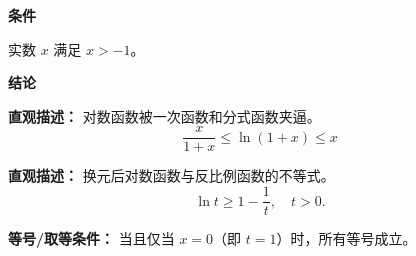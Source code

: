 \begin{statementbox}
\textbf{\textcolor{CStatement}{条件}}
\begin{description}[style=nextline, leftmargin=2.8em, labelsep=0.5em, itemsep=0.35em]
    \item[\textbf{\textcolor{CStatement}{条件 1（定义域）：}}] 实数 $x$ 满足 $x > -1$。
\end{description}

\textbf{\textcolor{CStatement}{结论}}
\begin{description}[style=nextline, leftmargin=2.8em, labelsep=0.5em, itemsep=0.45em]
    \item[\textbf{\textcolor{CStatement}{结论一（不等式链）：}}]
    \textbf{\textcolor{CStatement}{直观描述：}} 对数函数被一次函数和分式函数夹逼。
    \[
    \frac{x}{1+x} \le \ln(1+x) \le x
    \]

    \item[\textbf{\textcolor{CStatement}{推广结论（等价变形）：}}]
    \textbf{\textcolor{CStatement}{直观描述：}} 换元后对数函数与反比例函数的不等式。
    \[
    \ln t \ge 1 - \frac{1}{t}, \quad t > 0.
    \]
\end{description}

\textbf{\textcolor{CStatement}{等号/取等条件：}} 当且仅当 $x=0$（即 $t=1$）时，所有等号成立。
\end{statementbox}
